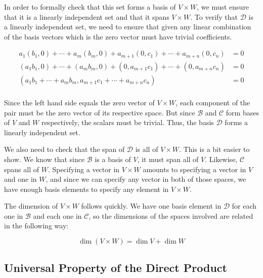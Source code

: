\documentclass[12pt, titlepage]{article}
\begin{document}
In order to formally check that this set forms a basis of $V \times W$, we must
ensure that it is a linearly independent set and that it spans $V \times W$. To
verify that $\mathcal{D}$ is a linearly independent set, we need to ensure that
given any linear combination of the basis vectors which is the zero vector must
have trivial coefficients.

\begin{displaymath}
  \begin{aligned}
    a_1(b_1, 0) + \cdots + a_m(b_m, 0) + a_{m + 1}(0, c_1) + \cdots + a_{m + n}(0, c_n) & = 0 \\
    (a_1b_1, 0) + \cdots + (a_mb_m, 0) + (0, a_{m + 1}c_1) + \cdots + (0, a_{m + n}c_n) & = 0 \\
    (a_1b_1 + \cdots + a_mb_m, a_{m + 1}c_1 + \cdots + a_{m + n}c_n)                    & = 0 \\
  \end{aligned}
\end{displaymath}

Since the left hand side equals the zero vector of $V \times W$, each component
of the pair must be the zero vector of its respective space. But since
$\mathcal{B}$ and $\mathcal{C}$ form bases of $V$ and $W$ respectively, the
scalars must be trivial. Thus, the basis $\mathcal{D}$ forms a linearly
independent set.

We also need to check that the span of $\mathcal{D}$ is all of $V \times W$.
This is a bit easier to show. We know that since $\mathcal{B}$ is a basis of
$V$, it must span all of $V$. Likewise, $\mathcal{C}$ spans all of $W$.
Specifying a vector in $V \times W$ amounts to specifying a vector in $V$ and
one in $W$, and since we can specify any vector in both of those spaces, we
have enough basis elements to specify any element in $V \times W$.

The dimension of $V \times W$ follows quickly. We have one basis element in
$\mathcal{D}$ for each one in $\mathcal{B}$ and each one in $\mathcal{C}$, so
the dimensions of the spaces involved are related in the following way:

\begin{displaymath}
  \dim(V \times W) = \dim V + \dim W
\end{displaymath}

\subsection{Universal Property of the Direct Product}
\end{document}
